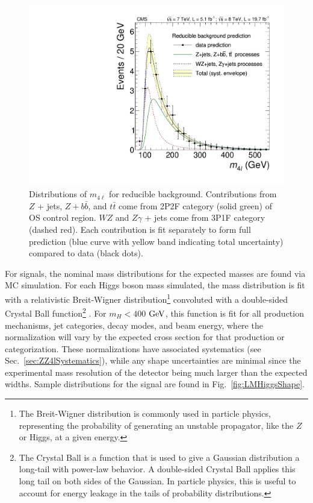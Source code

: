 \begin{figure}[htbp]
\begin{center}
\includegraphics[width=.6\linewidth]{HiggsDiscovery/figures/PredictedComponentsSR_withData_PAPER.pdf}
\caption[Reducible Background Mass Shapes]{Distributions of $m_{4\ell}$ for reducible background. Contributions from $Z$ + jets, $Z+b\bar{b}$, and $t\bar{t}$ come from 2P2F category (solid green) of OS control region. $WZ$ and $Z\gamma$ + jets come from 3P1F category (dashed red). Each contribution is fit separately to form full prediction (blue curve with yellow band indicating total uncertainty) compared to data (black dots).}
\label{fig:ZXMassShapes}
\end{center}
\end{figure}

For signals, the nominal mass distributions for the expected masses are found via MC simulation. For each Higgs boson mass simulated, the mass distribution is fit with a relativistic Breit-Wigner distribution\footnote{The Breit-Wigner distribution is commonly used in particle physics, representing the probability of generating an unstable propagator, like the $Z$ or Higgs, at a given energy.} convoluted with a double-sided Crystal Ball function\footnote{The Crystal Ball is a function that is used to give a Gaussian distribution a long-tail with power-law behavior. A double-sided Crystal Ball applies this long tail on both sides of the Gaussian. In particle physics, this is useful to account for energy leakage in the tails of probability distributions.} \cite{CrystalBall}. For $m_H < 400$ $\rm{GeV}$, this function is fit for all production mechanisms, jet categories, decay modes, and beam energy, where the normalization will vary by the expected cross section for that production or categorization. These normalizations have associated systematics (see Sec.~\ref{sec:ZZ4lSystematics}), while any shape uncertainties are minimal since the experimental mass resolution of the detector being much larger than the expected widths. Sample distributions for the signal are found in Fig.~\ref{fig:LMHiggsShape}.

